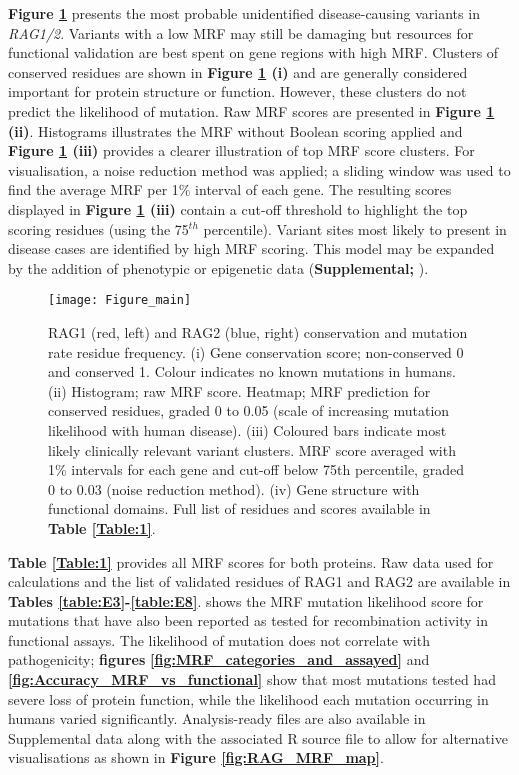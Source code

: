\documentclass[preprint,11pt,fleqn]{elsarticle}
\begin{document}
\textbf{Figure \ref{fig:Figure_main}} 
presents the most probable unidentified disease-causing variants in \textit{RAG1/2}. 
Variants with a low MRF may still be damaging but resources for functional validation are best spent on gene regions with high MRF. 
Clusters of conserved residues are shown in 
\textbf{Figure \ref{fig:Figure_main} (i)} and are generally considered important for protein structure or function.
However, these clusters do not predict the likelihood of mutation. 
Raw MRF scores are presented in 
\textbf{Figure \ref{fig:Figure_main} (ii)}. 
Histograms illustrates the MRF without Boolean scoring applied and 
\textbf{Figure \ref{fig:Figure_main} (iii)} 
provides a clearer illustration of top MRF score clusters. 
For visualisation, a noise reduction method was applied; a sliding window was used to find the average MRF per 1\% interval of each gene.
The resulting scores displayed in
\textbf{Figure \ref{fig:Figure_main} (iii)}
contain a cut-off threshold to highlight the top scoring residues (using the 75$^{th}$ percentile).
Variant sites most likely to present in disease cases are identified by high MRF scoring.
This model may be expanded by the addition of phenotypic or epigenetic data
(\textbf{Supplemental; }).

\begin{figure}[h]
\hspace*{0cm}   %
	\texttt{[image: Figure\_main]}
	\caption{RAG1 (red, left) and RAG2 (blue, right) conservation and mutation rate residue frequency. 
(i) Gene conservation score; non-conserved 0 and conserved 1. Colour indicates no known mutations in humans. 
(ii) Histogram; raw MRF score. 
Heatmap; MRF prediction for conserved residues, graded 0 to 0.05 (scale of increasing mutation likelihood with human disease). 
(iii) Coloured bars indicate most likely clinically relevant variant clusters.
MRF score averaged with 1\% intervals for each gene and cut-off below 75th percentile, graded 0 to 0.03 (noise reduction method). 
(iv) Gene structure with functional domains. Full list of residues and scores available in
\textbf{Table \ref{Table:1}}.}
	\label{fig:Figure_main}
\end{figure}

\textbf{Table
\ref{Table:1}}
provides all MRF scores for both proteins. Raw data used for calculations and the list of validated residues of RAG1 and RAG2 are available in 
\textbf{Tables \ref{table:E3}-\ref{table:E8}}.
\textbf{}
shows the MRF mutation likelihood score for mutations that have also been reported as tested for recombination activity in functional assays.
The likelihood of mutation does not correlate with pathogenicity; \textbf{figures}
\textbf{\ref{fig:MRF_categories_and_assayed}} and \textbf{\ref{fig:Accuracy_MRF_vs_functional}}
show that most mutations tested had severe loss of protein function, while the likelihood each mutation occurring in humans varied significantly. 
Analysis-ready files are also available in Supplemental data along with the associated R source file to allow for alternative visualisations as shown in \textbf{Figure
\ref{fig:RAG_MRF_map}}. 
\end{document}
